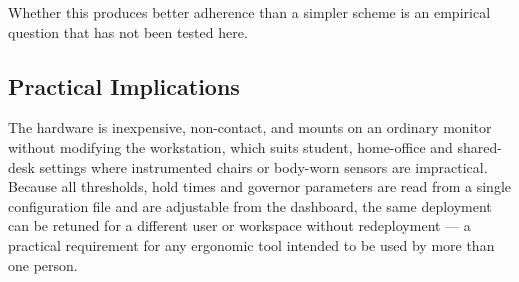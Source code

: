 Whether this produces better adherence than a simpler scheme is an empirical question that has not
been tested here.

\subsection{Practical Implications}

The hardware is inexpensive, non-contact, and mounts on an ordinary monitor without modifying the
workstation, which suits student, home-office and shared-desk settings where instrumented chairs or
body-worn sensors are impractical. Because all thresholds, hold times and governor parameters are
read from a single configuration file and are adjustable from the dashboard, the same deployment
can be retuned for a different user or workspace without redeployment --- a practical requirement
for any ergonomic tool intended to be used by more than one person.
